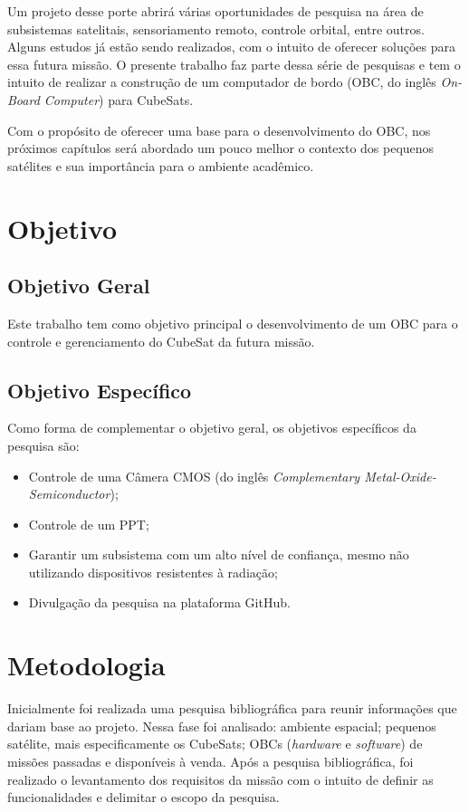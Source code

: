 Um projeto desse porte abrirá várias oportunidades de pesquisa na área de subsistemas satelitais, sensoriamento remoto, controle orbital, entre outros. Alguns estudos já estão sendo realizados, com o intuito de oferecer soluções para essa futura missão. O presente trabalho faz parte dessa série de pesquisas e tem o intuito de realizar a construção de um computador de bordo (OBC, do inglês \textit{On-Board Computer}) para CubeSats.

Com o propósito de oferecer uma base para o desenvolvimento do OBC, nos próximos capítulos será abordado um pouco melhor o contexto dos pequenos satélites e sua importância para o ambiente acadêmico. 

\section{Objetivo}

\subsection{Objetivo Geral}

Este trabalho tem como objetivo principal o desenvolvimento de um OBC para o controle e gerenciamento do CubeSat da futura missão.  

\subsection{Objetivo Específico}

Como forma de complementar o objetivo geral, os objetivos específicos da pesquisa são:

\begin{itemize}
	
	\item Controle de uma Câmera CMOS (do inglês \textit{Complementary Metal-Oxide-Semiconductor});
	\item Controle de um PPT;
	\item Garantir um subsistema com um alto nível de confiança, mesmo não utilizando dispositivos resistentes à radiação;
	\item Divulgação da pesquisa na plataforma GitHub.
	
\end{itemize}


\section{Metodologia}
\label{metodo}
Inicialmente foi realizada uma pesquisa bibliográfica para reunir informações que dariam base ao projeto. Nessa fase foi analisado: ambiente espacial; pequenos satélite, mais especificamente os CubeSats; OBCs (\textit{hardware} e \textit{software}) de missões passadas e disponíveis à venda. Após a pesquisa bibliográfica, foi realizado o levantamento dos requisitos da missão com o intuito de definir as funcionalidades e delimitar o escopo da pesquisa.

